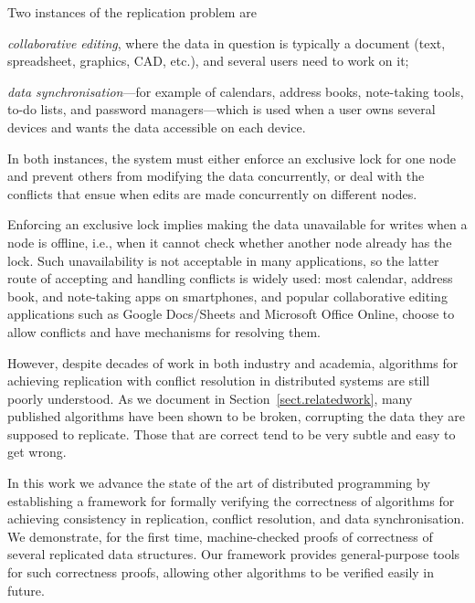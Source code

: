 \documentclass[acmlarge,review,anonymous]{acmart}\settopmatter{printfolios=true}
\begin{document}
Two instances of the replication problem are
\begin{inparaenum}
\item \emph{collaborative editing}, where the data in question is typically a document (text,
    spreadsheet, graphics, CAD, etc.), and several users need to work on it;
\item \emph{data synchronisation}---for example of calendars, address books, note-taking tools,
    to-do lists, and password managers---which is used when a user owns several devices and wants
    the data accessible on each device.
\end{inparaenum}
In both instances, the system must either enforce an exclusive lock for one node and prevent others
from modifying the data concurrently, or deal with the conflicts that ensue when edits are made
concurrently on different nodes.

Enforcing an exclusive lock implies making the data unavailable for writes when a node is offline,
i.e., when it cannot check whether another node already has the lock. Such unavailability is not
acceptable in many applications, so the latter route of accepting and handling conflicts is widely
used: most calendar, address book, and note-taking apps on smartphones, and popular collaborative
editing applications such as Google Docs/Sheets and Microsoft Office Online, choose to allow
conflicts and have mechanisms for resolving them.

However, despite decades of work in both industry and academia, algorithms for achieving replication
with conflict resolution in distributed systems are still poorly understood. As we document in
Section~\ref{sect.relatedwork}, many published algorithms have been shown to be broken, corrupting
the data they are supposed to replicate. Those that are correct tend to be very subtle and easy to
get wrong.

In this work we advance the state of the art of distributed programming by establishing a framework
for formally verifying the correctness of algorithms for achieving consistency in replication,
conflict resolution, and data synchronisation. We demonstrate, for the first time, machine-checked
proofs of correctness of several replicated data structures. Our framework provides general-purpose
tools for such correctness proofs, allowing other algorithms to be verified easily in future.

\end{document}
